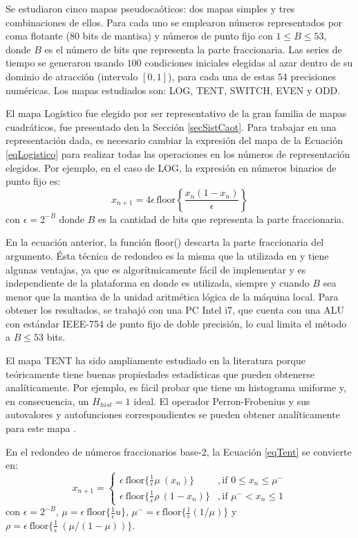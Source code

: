 Se estudiaron cinco mapas pseudocaóticos: dos mapas simples y tres combinaciones de ellos.
Para cada uno se emplearon números representados por coma flotante (80 bits de mantisa) y números de punto fijo con $1\leq B \leq 53$, donde $B$ es el número de bits que representa la parte fraccionaria.
Las series de tiempo se generaron usando $100$ condiciones iniciales elegidas al azar dentro de su dominio de atracción (intervalo $[0,1]$), para cada una de estas $54$ precisiones numéricas.
Los mapas estudiados son: LOG, TENT, SWITCH, EVEN y ODD.

El mapa Logístico fue elegido por ser representativo de la gran familia de mapas cuadráticos, fue presentado den la Sección \ref{secSistCaot}.
Para trabajar en una representación dada, es necesario cambiar la expresión del mapa de la Ecuación \ref{eqLogistico} para realizar todas las operaciones en los números de representación elegidos.
Por ejemplo, en el caso de LOG, la expresión en números binarios de punto fijo es:
%
\begin{equation}\label{eq:logimapB2}
x_{n+1}=4 \epsilon \,\text{floor}\left\{\frac{x_n(1-x_n)}{\epsilon}\right\}
\end{equation}
%
con $\epsilon = 2^{-B}$ donde $B$ es la cantidad de bits que representa la parte fraccionaria.

En la ecuación anterior, la función floor() descarta la parte fraccionaria del argumento. Ésta técnica de redondeo es la misma que la utilizada en \cite{Antonelli2012, Grebogi1988, Nagaraj2008} y tiene algunas ventajas, ya que es algorítmicamente fácil de implementar y es independiente de la plataforma en donde es utilizada, siempre y cuando $B$ sea menor que la mantisa de la unidad aritmética lógica de la máquina local.
Para obtener los resultados, se trabajó con una PC Intel i7, que cuenta con una ALU con estándar IEEE-754 de punto fijo de doble precisión, lo cual limita el método a $B \leq 53$ bits.

El mapa TENT ha sido ampliamente estudiado en la literatura porque teóricamente tiene buenas propiedades estadísticas que pueden obtenerse analíticamente.
Por ejemplo, es fácil probar que tiene un histograma uniforme y, en consecuencia, un $H_{hist} = 1$ ideal.
El operador Perron-Frobenius y sus autovalores y autofunciones correspondientes se pueden obtener analíticamente para este mapa \cite{Lasota1994}.

En el redondeo de números fraccionarios base-2, la Ecuación \ref{eqTent} se convierte en:
%
\begin{equation}\label{eq:TENTB2}
x_{n+1} = 
\begin{cases}
\epsilon ~\text{floor} \{\frac{1}{\epsilon} \mu~(x_n)\} &, \textrm{if } 0\leq x_n\leq \mu^-\\
\epsilon ~\text{floor} \{\frac{1}{\epsilon} \rho~(1-x_n)\} &, \textrm{if } \mu^-<x_n\leq 1 
\end{cases}	
\end{equation}
con $\epsilon=2^{-B}$, $\mu = \epsilon ~\text{floor}\{\frac{1}{\epsilon} u\}$, $\mu^- = \epsilon ~\text{floor}\{\frac{1}{\epsilon} (1/\mu)\}$ y $\rho = \epsilon ~\text{floor}\{\frac{1}{\epsilon} ~(\mu/(1-\mu)) \}$.


